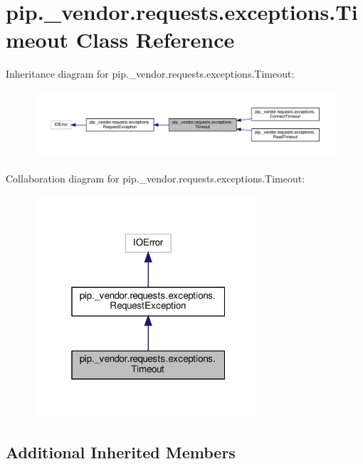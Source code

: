 \hypertarget{classpip_1_1__vendor_1_1requests_1_1exceptions_1_1Timeout}{}\section{pip.\+\_\+vendor.\+requests.\+exceptions.\+Timeout Class Reference}
\label{classpip_1_1__vendor_1_1requests_1_1exceptions_1_1Timeout}


Inheritance diagram for pip.\+\_\+vendor.\+requests.\+exceptions.\+Timeout\+:
\nopagebreak
\begin{figure}[H]
\begin{center}
\leavevmode
\includegraphics[width=350pt]{classpip_1_1__vendor_1_1requests_1_1exceptions_1_1Timeout__inherit__graph}
\end{center}
\end{figure}


Collaboration diagram for pip.\+\_\+vendor.\+requests.\+exceptions.\+Timeout\+:
\nopagebreak
\begin{figure}[H]
\begin{center}
\leavevmode
\includegraphics[width=241pt]{classpip_1_1__vendor_1_1requests_1_1exceptions_1_1Timeout__coll__graph}
\end{center}
\end{figure}
\subsection*{Additional Inherited Members}



